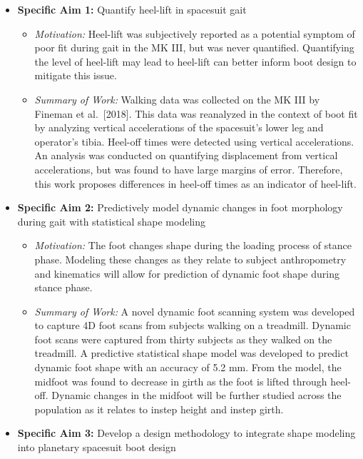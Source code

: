 \documentclass[defaultstyle,11pt]{comps}
\providecommand{\tightlist}{%
  \setlength{\itemsep}{0pt}\setlength{\parskip}{0pt}}
\begin{document}
\begin{itemize}
\tightlist
\item
  \textbf{Specific Aim 1: } Quantify heel-lift in spacesuit gait

  \begin{itemize}
  \tightlist
  \item
    \emph{Motivation:} Heel-lift was subjectively reported as a potential symptom of poor fit during gait in the MK III, but was never quantified. Quantifying the level of heel-lift may lead to heel-lift can better inform boot design to mitigate this issue.
  \item
    \emph{Summary of Work:} Walking data was collected on the MK III by Fineman et al.~{[}2018{]}. This data was reanalyzed in the context of boot fit by analyzing vertical accelerations of the spacesuit's lower leg and operator's tibia. Heel-off times were detected using vertical accelerations. An analysis was conducted on quantifying displacement from vertical accelerations, but was found to have large margins of error. Therefore, this work proposes differences in heel-off times as an indicator of heel-lift.
  \end{itemize}
\item
  \textbf{Specific Aim 2: } Predictively model dynamic changes in foot morphology during gait with statistical shape modeling

  \begin{itemize}
  \tightlist
  \item
    \emph{Motivation:} The foot changes shape during the loading process of stance phase. Modeling these changes as they relate to subject anthropometry and kinematics will allow for prediction of dynamic foot shape during stance phase.
  \item
    \emph{Summary of Work:} A novel dynamic foot scanning system was developed to capture 4D foot scans from subjects walking on a treadmill. Dynamic foot scans were captured from thirty subjects as they walked on the treadmill. A predictive statistical shape model was developed to predict dynamic foot shape with an accuracy of 5.2 mm. From the model, the midfoot was found to decrease in girth as the foot is lifted through heel-off. Dynamic changes in the midfoot will be further studied across the population as it relates to instep height and instep girth.
  \end{itemize}
\item
  \textbf{Specific Aim 3: } Develop a design methodology to integrate shape modeling into planetary spacesuit boot design


\end{itemize}
\end{document}
